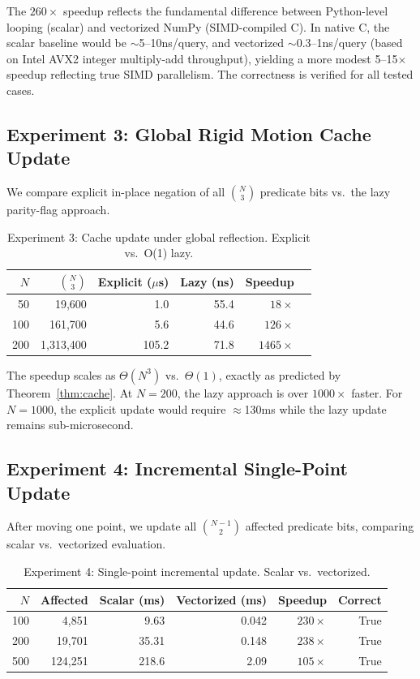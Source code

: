 \documentclass[11pt,letterpaper]{article}
\begin{document}
The $260\times$ speedup reflects the fundamental difference between Python-level looping
(scalar) and vectorized NumPy (SIMD-compiled C).  In native C, the scalar baseline would
be $\sim$5--10ns/query, and vectorized $\sim$0.3--1ns/query (based on Intel AVX2 integer
multiply-add throughput), yielding a more modest 5--15$\times$ speedup reflecting true
SIMD parallelism.  The correctness is verified for all tested cases.

\subsection{Experiment 3: Global Rigid Motion Cache Update}

We compare explicit in-place negation of all $\binom{N}{3}$ predicate bits vs.\ the
lazy parity-flag approach.

\begin{table}[ht]
\centering
\caption{Experiment 3: Cache update under global reflection. Explicit vs.\ O(1) lazy.}
\label{tab:exp3}
\begin{tabular}{rrrrrr}
\toprule
$N$ & $\binom{N}{3}$ & Explicit ($\mu$s) & Lazy (ns) & Speedup \\
\midrule
50  & 19,600   & 1.0   & 55.4 & $18\times$ \\
100 & 161,700  & 5.6   & 44.6 & $126\times$ \\
200 & 1,313,400 & 105.2 & 71.8 & $1465\times$ \\
\bottomrule
\end{tabular}
\end{table}

The speedup scales as $\Theta(N^3)$ vs.\ $\Theta(1)$, exactly as predicted by
Theorem~\ref{thm:cache}.  At $N=200$, the lazy approach is over $1000\times$ faster.
For $N=1000$, the explicit update would require $\approx$130ms while the lazy update
remains sub-microsecond.

\subsection{Experiment 4: Incremental Single-Point Update}

After moving one point, we update all $\binom{N-1}{2}$ affected predicate bits, comparing
scalar vs.\ vectorized evaluation.

\begin{table}[ht]
\centering
\caption{Experiment 4: Single-point incremental update. Scalar vs.\ vectorized.}
\label{tab:exp4}
\begin{tabular}{rrrrrr}
\toprule
$N$ & Affected & Scalar (ms) & Vectorized (ms) & Speedup & Correct \\
\midrule
100 & 4,851    & 9.63  & 0.042 & $230\times$ & True \\
200 & 19,701   & 35.31 & 0.148 & $238\times$ & True \\
500 & 124,251  & 218.6 & 2.09  & $105\times$ & True \\
\bottomrule
\end{tabular}
\end{table}
\end{document}
